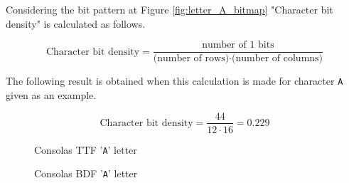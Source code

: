 \documentclass{article}
\begin{document}
Considering the bit pattern at Figure \ref{fig:letter_A_bitmap} "Character bit density" is calculated  as follows.

\[
  \textrm{Character bit density} = \frac{\textrm{number of 1 bits}}{\textrm{(number of rows)}\cdot\textrm{(number of columns)}}
\]

The following result is obtained when this calculation is made for character \texttt{A} given as an example.

\[
  \textrm{Character bit density} = \frac{44}{{12}\cdot{16}} = 0.229
\]

\def\pixelmapnobb{{%
  {1,1,0,0,0,0,0,0,1,1,0,0,0,0,0,0},
  {0,1,0,0,0,0,0,0,1,1,0,0,0,0,0,0},
  {0,1,1,0,0,0,0,0,1,1,0,0,0,0,0,0},
  {0,1,1,1,1,1,1,1,1,0,0,0,0,0,0,0},
  {0,0,1,0,0,0,0,1,1,0,0,0,0,0,0,0},
  {0,0,1,1,0,0,0,1,1,0,0,0,0,0,0,0},
  {0,0,1,1,0,0,0,1,0,0,0,0,0,0,0,0},
  {0,0,0,1,0,0,1,1,0,0,0,0,0,0,0,0},
  {0,0,0,1,0,0,1,1,0,0,0,0,0,0,0,0},
  {0,0,0,1,1,0,1,0,0,0,0,0,0,0,0,0},
  {0,0,0,0,1,1,1,0,0,0,0,0,0,0,0,0},
  {0,0,0,0,1,1,1,0,0,0,0,0,0,0,0,0},
}}
\def\pixelmapbb{{%
  {1,1,0,0,0,0,0,0,1,1},
  {0,1,0,0,0,0,0,0,1,1},
  {0,1,1,0,0,0,0,0,1,1},
  {0,1,1,1,1,1,1,1,1,0},
  {0,0,1,0,0,0,0,1,1,0},
  {0,0,1,1,0,0,0,1,1,0},
  {0,0,1,1,0,0,0,1,0,0},
  {0,0,0,1,0,0,1,1,0,0},
  {0,0,0,1,0,0,1,1,0,0},
  {0,0,0,1,1,0,1,0,0,0},
  {0,0,0,0,1,1,1,0,0,0},
  {0,0,0,0,1,1,1,0,0,0},
}}


\begin{figure}[htbp]
  \begin{minipage}{0.45\textwidth}
    \centering
    \caption{Consolas TTF '\texttt{A}' letter}
    \label{fig:consolas_A}

    
  \end{minipage}\hfill%
  \begin{minipage}{0.48\textwidth}
    \centering
    \caption{Consolas BDF '\texttt{A}' letter}
    \label{fig:letter_A}

  \end{minipage}
\end{figure}
\end{document}
